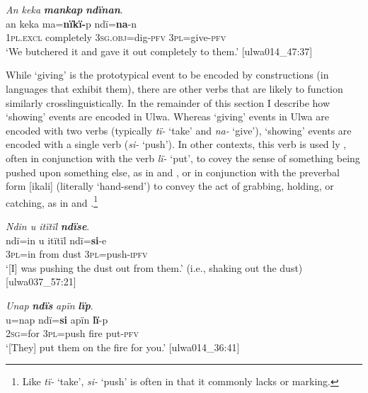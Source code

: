 \ea%
    \label{ex:clause:48}
          \textit{An keka} \textbf{\textit{mankap}} \textbf{\textit{ndïnan}}.\\
\gll an      keka      ma=\textbf{nïkï-}p      ndï=\textbf{na}{}-n\\
    1\textsc{pl.excl}  completely  \textsc{3sg.obj}=dig{}-\textsc{pfv}  \textsc{3pl=}give-\textsc{pfv}\\
\glt `We butchered it and gave it out completely to them.’ [ulwa014\_47:37]
\z




While ‘giving’ is the prototypical event to be encoded by  constructions (in languages that exhibit them), there are other verbs that are likely to function similarly crosslinguistically. In the remainder of this section I describe how ‘showing’ events are encoded in Ulwa. Whereas ‘giving’ events in Ulwa are encoded with two  verbs (typically \textit{tï-} ‘take’ and \textit{na-} ‘give’), ‘showing’ events are encoded with a single  verb (\textit{si-} ‘push’). In other contexts, this verb is used ly , often in conjunction with the verb \textit{lï-} ‘put’, to covey the sense of something being pushed upon something else, as in  and , or in conjunction with the preverbal form [ikali] (literally ‘hand-send’) to convey the act of grabbing, holding, or catching, as in  and .\footnote{Like \textit{tï-} ‘take’, \textit{si-} ‘push’ is often  in that it commonly lacks  or   marking.}

\ea%
    \label{ex:clause:49}
          \textit{Ndin u itïtïl} \textbf{\textit{ndïse}}.\\
\gll ndï=in  u    itïtïl  ndï=\textbf{si}{}-e\\
    3\textsc{pl}=in  from  dust  \textsc{3pl}=push-\textsc{ipfv}\\
\glt `[I] was pushing the dust out from them.’ (i.e., shaking out the dust) [ulwa037\_57:21]
\z

\ea%
    \label{ex:clause:50}
          \textit{Unap} \textbf{\textit{ndïs}} \textit{apïn} \textbf{\textit{lïp}}.\\
\gll u=nap    ndï=\textbf{si}    apïn  \textbf{lï}{}-p\\
    2\textsc{sg=}for  3\textsc{pl}=push  fire    put-\textsc{pfv}\\
\glt `[They] put them on the fire for you.’ [ulwa014\_36:41]
\z

